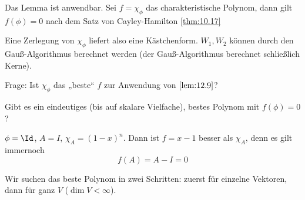\documentclass{mycourse}
\begin{document}
Das Lemma ist anwendbar.
Sei $f=\chi_\phi$ das charakteristische Polynom,
dann gilt $f(\phi)=0$ nach dem Satz von Cayley-Hamilton \ref{thm:10.17}

Eine Zerlegung von $\chi_\phi$ liefert also eine Kästchenform.
$W_1,W_2$ können durch den Gauß-Algorithmus berechnet werden (der Gauß-Algorithmus berechnet schließlich Kerne).

Frage: Ist $\chi_\phi$ das „beste“ $f$ zur Anwendung von $\ref{lem:12.9}$?

Gibt es ein eindeutiges (bis auf skalare Vielfache), bestes Polynom mit $f(\phi)=0$?
\begin{ex}
$\phi = \Id$, $A=I$, $\chi_A = (1-x)^n$.
Dann ist $f=x-1$ besser als $\chi_A$, denn es gilt immernoch
\[
	f(A)=A-I=0
\]
\end{ex}

Wir suchen das beste Polynom in zwei Schritten:
zuerst für einzelne Vektoren, dann für ganz $V$ ($\dim V<\infty$).
\end{document}
